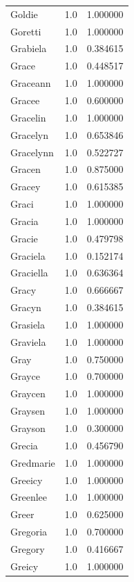 \documentclass[
  letterpaper,
  DIV=11,
  numbers=noendperiod]{scrreprt}
\begin{document}
\begin{tabular}{lrr}
Goldie          &   1.0 &   1.000000 \\
Goretti         &   1.0 &   1.000000 \\
Grabiela        &   1.0 &   0.384615 \\
Grace           &   1.0 &   0.448517 \\
Graceann        &   1.0 &   1.000000 \\
Gracee          &   1.0 &   0.600000 \\
Gracelin        &   1.0 &   1.000000 \\
Gracelyn        &   1.0 &   0.653846 \\
Gracelynn       &   1.0 &   0.522727 \\
Gracen          &   1.0 &   0.875000 \\
Gracey          &   1.0 &   0.615385 \\
Graci           &   1.0 &   1.000000 \\
Gracia          &   1.0 &   1.000000 \\
Gracie          &   1.0 &   0.479798 \\
Graciela        &   1.0 &   0.152174 \\
Graciella       &   1.0 &   0.636364 \\
Gracy           &   1.0 &   0.666667 \\
Gracyn          &   1.0 &   0.384615 \\
Grasiela        &   1.0 &   1.000000 \\
Graviela        &   1.0 &   1.000000 \\
Gray            &   1.0 &   0.750000 \\
Grayce          &   1.0 &   0.700000 \\
Graycen         &   1.0 &   1.000000 \\
Graysen         &   1.0 &   1.000000 \\
Grayson         &   1.0 &   0.300000 \\
Grecia          &   1.0 &   0.456790 \\
Gredmarie       &   1.0 &   1.000000 \\
Greeicy         &   1.0 &   1.000000 \\
Greenlee        &   1.0 &   1.000000 \\
Greer           &   1.0 &   0.625000 \\
Gregoria        &   1.0 &   0.700000 \\
Gregory         &   1.0 &   0.416667 \\
Greicy          &   1.0 &   1.000000 \\

\end{tabular}
\end{document}
